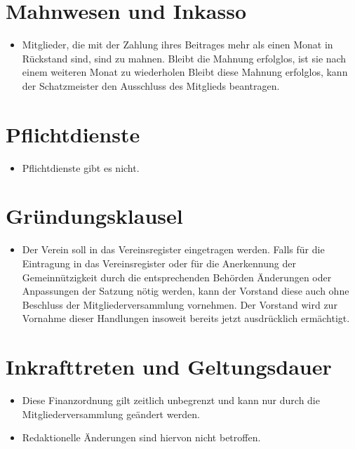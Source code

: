 \documentclass[a4paper,10pt]{article}
\begin{document}
\section{Mahnwesen und Inkasso}
\begin{itemize}
 \item Mitglieder, die mit der Zahlung ihres Beitrages mehr als einen Monat in Rückstand sind, sind zu mahnen. Bleibt die Mahnung erfolglos, ist sie nach einem weiteren Monat zu wiederholen Bleibt diese Mahnung erfolglos, kann der Schatzmeister den Ausschluss des Mitglieds beantragen. 
\end{itemize}

\section{Pflichtdienste}
\begin{itemize}
 \item Pflichtdienste gibt es nicht.
\end{itemize}

\section{Gründungsklausel}
\begin{itemize}
 \item Der Verein soll in das Vereinsregister eingetragen werden. Falls für die Eintragung in das Vereinsregister oder für die Anerkennung der Gemeinnützigkeit durch die entsprechenden Behörden Änderungen oder Anpassungen der Satzung nötig werden, kann der Vorstand diese auch ohne Beschluss der Mitgliederversammlung vornehmen. Der Vorstand wird zur Vornahme dieser Handlungen insoweit bereits jetzt ausdrücklich ermächtigt. 
\end{itemize}


\section{Inkrafttreten und Geltungsdauer}
\begin{itemize}
 \item Diese Finanzordnung gilt zeitlich unbegrenzt und kann nur durch die Mitgliederversammlung geändert werden. 
 \item Redaktionelle Änderungen sind hiervon nicht betroffen.
\end{itemize}
\end{document}
